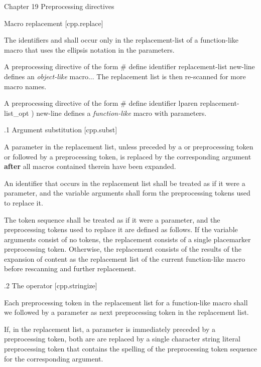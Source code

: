 


\chap Chapter 19 Preprocessing directives

 Macro replacement [cpp.replace]

The identifiers  and  shall
occur only in the replacement-list of a function-like macro that uses the
ellipsis notation in the parameters.

A preprocessing directive of the form
\begtt
# define identifier replacement-list new-line
\endtt
defines an {\it object-like} macro... The replacement list is then re-scanned
for more macro names.

A preprocessing directive of the form
\begtt
# define identifier lparen replacement-list_opt ) new-line
\endtt
defines a {\it function-like} macro with parameters.


.1 Argument substitution [cpp.subst]

A parameter in the replacement list, unless preceded by a \symbol{\#} or
\symbol{\#\#} preprocessing token or followed by a \symbol{\#\#} preprocessing
token, is replaced by the corresponding argument {\bf after} all macros contained
therein have been expanded.

An identifier  that occurs in the replacement list
shall be treated as if it were a parameter, and the variable arguments shall
form the preprocessing tokens used to replace it.

The token sequence  shall be treated as if it
were a parameter, and the preprocessing tokens used to replace it are defined as
follows. If the variable arguments consist of no tokens, the replacement
consists of a single placemarker preprocessing token.  Otherwise, the
replacement consists of the results of the expansion of content as the
replacement list of the current function-like macro before rescanning and
further replacement.

.2 The \symbol{\#} operator [cpp.stringize]

Each \symbol{\#} preprocessing token in the replacement list for a function-like
macro shall we followed by a parameter as next preprocessing token in the
replacement list.

If, in the replacement list, a parameter is immediately preceded by a \symbol{\#}
preprocessing token, both are are replaced by a single character string literal
preprocessing token that contains the spelling of the preprocessing token
sequence for the corresponding argument.


